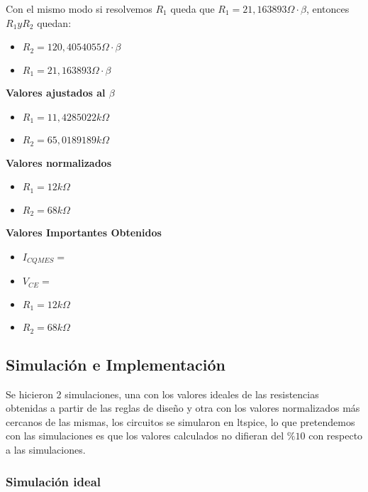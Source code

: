 \begin{multicols}{2}
			\sangria{} Con el mismo modo si resolvemos $R_1$ queda que $R_1=21,163893\Omega \cdot \beta$, entonces $R_1 y R_2$ quedan:
            \begin{itemize}[nosep]
				\item $R_2 = 120,4054055\Omega \cdot \beta$
				\item $R_1 = 21,163893\Omega \cdot \beta$
            \end{itemize}


            \textbf{Valores ajustados al $\beta$}
            \begin{itemize}[nosep]
				\item $R_1 = 11,4285022 k\Omega$
				\item $R_2 = 65,0189189 k\Omega$
			\end{itemize}


            \textbf{Valores normalizados}
            \begin{itemize}[nosep]
				\item $R_1 = 12 k\Omega$
				\item $R_2 = 68 k\Omega$
			\end{itemize}

			\textbf{Valores Importantes Obtenidos}
            \begin{itemize}[nosep]
            	\item $I_{CQMES} = $
            	\item $V_{CE} = $
				\item $R_1 = 12 k\Omega$
				\item $R_2 = 68 k\Omega$
			\end{itemize}
		\subsection{Simulación e Implementación}
        \sangria{}Se hicieron 2 simulaciones, una con los valores ideales de las resistencias obtenidas a partir de las reglas de diseño y otra con los valores normalizados más cercanos de las mismas, los circuitos se simularon en ltspice, lo que pretendemos con las simulaciones es que los valores calculados no difieran del $\%10$ con respecto a las simulaciones.

			\subsubsection{Simulación ideal}


\end{multicols}

